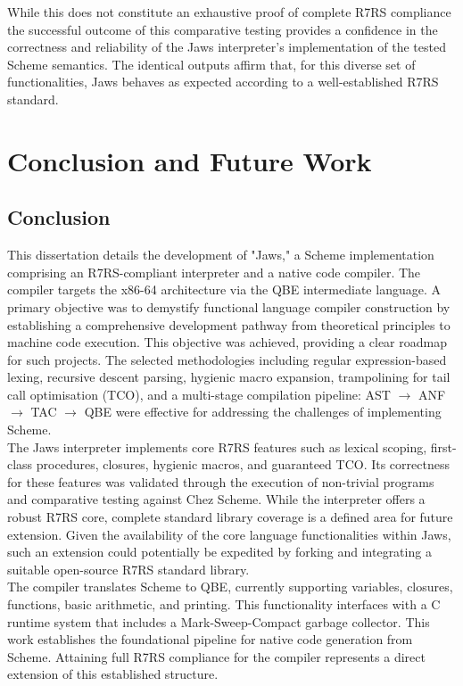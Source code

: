 \documentclass[final]{cmpreport_02}
\begin{document}
While this does not constitute an exhaustive proof of complete R7RS compliance the successful outcome of this comparative testing provides a confidence in the correctness and reliability of the Jaws interpreter's implementation of the tested Scheme semantics. The identical outputs affirm that, for this diverse set of functionalities, Jaws behaves as expected according to a well-established R7RS standard.
\section{Conclusion and Future Work}

\subsection{Conclusion}

This dissertation details the development of "Jaws," a Scheme implementation comprising an R7RS-compliant interpreter and a native code compiler. The compiler targets the x86-64 architecture via the QBE intermediate language. A primary objective was to demystify functional language compiler construction by establishing a comprehensive development pathway from theoretical principles to machine code execution. This objective was achieved, providing a clear roadmap for such projects. The selected methodologies including regular expression-based lexing, recursive descent parsing, hygienic macro expansion, trampolining for tail call optimisation (TCO), and a multi-stage compilation pipeline: AST $\rightarrow$ ANF $\rightarrow$ TAC $\rightarrow$ QBE were effective for addressing the challenges of implementing Scheme.\\

The Jaws interpreter implements core R7RS features such as lexical scoping, first-class procedures, closures, hygienic macros, and guaranteed TCO. Its correctness for these features was validated through the execution of non-trivial programs and comparative testing against Chez Scheme. While the interpreter offers a robust R7RS core, complete standard library coverage is a defined area for future extension. Given the availability of the core language functionalities within Jaws, such an extension could potentially be expedited by forking and integrating a suitable open-source R7RS standard library. \\

The compiler translates Scheme to QBE, currently supporting variables, closures, functions, basic arithmetic, and printing. This functionality interfaces with a C runtime system that includes a Mark-Sweep-Compact garbage collector. This work establishes the foundational pipeline for native code generation from Scheme. Attaining full R7RS compliance for the compiler represents a direct extension of this established structure.\\
\end{document}
